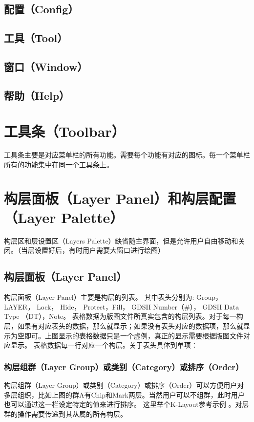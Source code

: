 \subsection{配置（Config）} \label{SectMaskMenuCnfg} 
\subsection{工具（Tool）} \label{SectMaskMenuTool}
\subsection{窗口（Window）} \label{SectMaskMenuWndw} 
\subsection{帮助（Help）} \label{SectMaskMenuHelp}

\section{工具条（Toolbar）} \label{SectMaskToolbar}
工具条主要是对应菜单栏的所有功能。需要每个功能有对应的图标。每一个菜单栏所有的功能集中在同一个工具条上。

\section{构层面板（Layer Panel）和构层配置（Layer Palette）} \label{SectMaskLayers}
构层区和层设置区（Layers Palette）缺省随主界面，但是允许用户自由移动和关闭。（当层设置好后，有时用户需要大窗口进行绘图）

\subsection{构层面板（Layer Panel）} \label{SectMaskLayerPanel} 
构层面板（Layer Panel）主要是构层的列表。
其中表头分别为: Group， LAYER， Lock， Hide， Protect，Fill， GDSII Number（\#）， GDSII Data Type （DT），Note。
表格数据为版图文件所真实包含的构层列表。对于每一构层，如果有对应表头的数据，那么就显示；如果没有表头对应的数据项，那么就显示为空即可。上图显示的表格数据只是一个虚例，真正的显示需要根据版图文件对应显示。
表格数据每一行对应一个构层。关于表头具体到单项：
\subsubsection{构层组群（Layer Group）或类别（Category）或排序（Order）}
构层组群（Layer Group）或类别（Category）或排序（Order）可以方便用户对多层组织，比如上图的群A有Chip和Mark两层。当然用户可以不组群，此时用户也可以通过这一栏设定特定的值来进行排序。
这里举个K-Layout参考示例 。对层群的操作需要传递到其从属的所有构层。
